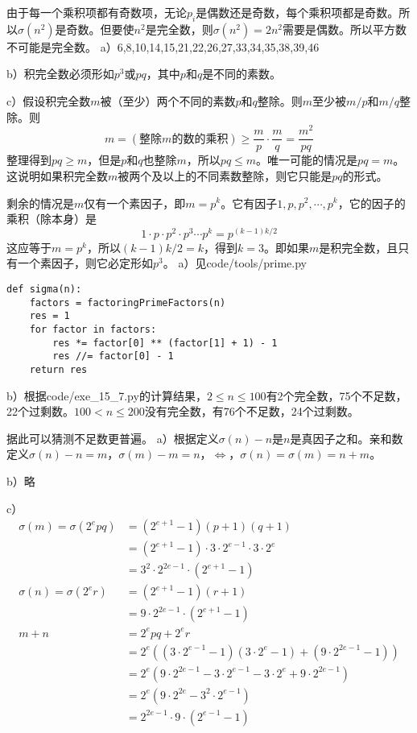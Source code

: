 由于每一个乘积项都有奇数项，无论$p_i$是偶数还是奇数，每个乘积项都是奇数。所以$\sigma(n^2)$是奇数。但要使$n^2$是完全数，则$\sigma(n^2)=2n^2$需要是偶数。所以平方数不可能是完全数。
%
\exercise a）6,8,10,14,15,21,22,26,27,33,34,35,38,39,46\par
b）积完全数必须形如$p^3$或$pq$，其中$p$和$q$是不同的素数。\par
c）\proof 假设积完全数$m$被（至少）两个不同的素数$p$和$q$整除。则$m$至少被$m/p$和$m/q$整除。则
\[m=(\text{整除$m$的数的乘积})\ge\frac{m}{p}\cdot\frac{m}{q}=\frac{m^2}{pq}\]
整理得到$pq\ge m$，但是$p$和$q$也整除$m$，所以$pq\le m$。唯一可能的情况是$pq=m$。这说明如果积完全数$m$被两个及以上的不同素数整除，则它只能是$pq$的形式。\par
剩余的情况是$m$仅有一个素因子，即$m=p^k$。它有因子$1,p,p^2,\cdots,p^k$，它的因子的乘积（除本身）是
\[1\cdot p\cdot p^2\cdot p^3\cdots p^k=p^{(k-1)k/2}\]
这应等于$m=p^k$，所以$(k-1)k/2=k$，得到$k=3$。即如果$m$是积完全数，且只有一个素因子，则它必定形如$p^3$。
%
\exercise a）见code/tools/prime.py
\begin{lstlisting}
def sigma(n):
    factors = factoringPrimeFactors(n)
    res = 1
    for factor in factors:
        res *= factor[0] ** (factor[1] + 1) - 1
        res //= factor[0] - 1
    return res
\end{lstlisting}
b）根据code/exe\_15\_7.py的计算结果，$2\le n\le100$有2个完全数，75个不足数，22个过剩数。$100<n\le200$没有完全数，有76个不足数，24个过剩数。\par
据此可以猜测不足数更普遍。
%
\exercise a）\proof 根据定义$\sigma(n)-n$是$n$是真因子之和。亲和数定义$\sigma(n)-n=m$，$\sigma(m)-m=n$，$\Leftrightarrow$，$\sigma(n)=\sigma(m)=n+m$。\par
b）略\par
c）\proof 
\begin{align*}
\sigma(m)=\sigma(2^epq)&=(2^{e+1}-1)(p+1)(q+1) \\
&=(2^{e+1}-1)\cdot3\cdot2^{e-1}\cdot3\cdot2^e \\
&=3^2\cdot2^{2e-1}\cdot(2^{e+1}-1) \\
\sigma(n)=\sigma(2^er)&=(2^{e+1}-1)(r+1) \\
&=9\cdot2^{2e-1}\cdot(2^{e+1}-1) \\
m+n&=2^epq+2^er \\
&=2^e\left((3\cdot2^{e-1}-1)(3\cdot2^e-1)+(9\cdot2^{2e-1}-1)\right)\\
&=2^e(9\cdot2^{2e-1}-3\cdot2^{e-1}-3\cdot2^e+9\cdot2^{2e-1}) \\
&=2^e(9\cdot2^{2e}-3^2\cdot2^{e-1}) \\
&=2^{2e-1}\cdot9\cdot(2^{e-1}-1)
\end{align*}
